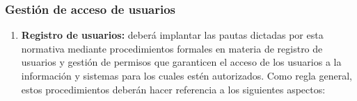 
\subsubsection{Gestión de acceso de usuarios}

\begin{enumerate}[label=\alph*)]

    \item \textbf{Registro de usuarios:} \Beneficiario{} deberá implantar las pautas dictadas por esta normativa mediante procedimientos formales en materia de registro de usuarios y gestión de permisos que garanticen el acceso de los usuarios a la información y sistemas para los cuales estén autorizados. Como regla general, estos procedimientos deberán hacer referencia a los siguientes aspectos:


\end{enumerate}
